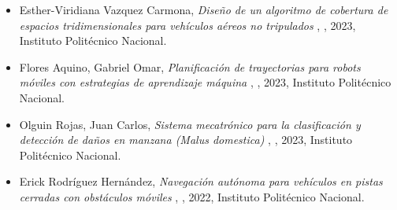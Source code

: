 \begin{itemize} 
\item Esther-Viridiana Vazquez Carmona, \textit{ Diseño de un algoritmo de cobertura de espacios tridimensionales para vehículos aéreos no tripulados }, \href{ https://jivg.org/wp-content/uploads/2023/02/2023_phd_Vazquez.pdf }{\faExternalLink}, 2023, Instituto Politécnico Nacional. 
\item Flores Aquino, Gabriel Omar, \textit{ Planificación de trayectorias para robots móviles con estrategias de aprendizaje máquina }, \href{ https://jivg.org/wp-content/uploads/2024/01/2023_phd_Flores_Aquino.pdf }{\faExternalLink}, 2023, Instituto Politécnico Nacional. 
\item Olguin Rojas, Juan Carlos, \textit{ Sistema mecatrónico para la clasificación y detección de daños en manzana (Malus domestica) }, \href{ https://jivg.org/wp-content/uploads/2024/01/2023_phd_Olguin_Rojas.pdf }{\faExternalLink}, 2023, Instituto Politécnico Nacional. 
\item Erick Rodríguez Hernández, \textit{ Navegación autónoma para vehículos en pistas cerradas con obstáculos móviles }, \href{ https://jivg.org/wp-content/uploads/2022/08/2022_phd_Rodriguez.pdf }{\faExternalLink}, 2022, Instituto Politécnico Nacional. 
\end{itemize} 
